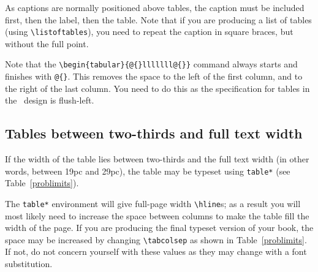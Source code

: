 As captions are normally positioned above tables, the caption must be included first, then the label, then the table. Note that if you are producing a list of tables (using \verb"\listoftables"), you need to repeat the caption in square braces, but without the full point.

Note that the \verb"\begin{tabular}{@{}lllllll@{}}" command always starts and finishes with \verb"@{}". This removes the space to the left of the first column, and to the right of the last column. You need to do this as the specification for tables in the \cambridge\ design is flush-left.

\subsection{Tables between two-thirds and full text width}
\label{overtwothirds}

If the width of the table lies between two-thirds and the full text width (in other words, between 19pc and 29pc), the table may be typeset using \verb"table*" (see Table~\ref{problimits}).

The \verb"table*" environment will give full-page width \verb"\hline"s; as a result you will most likely need to increase the space between columns to make the table fill the width of the page. If you are producing the final typeset version of your book, the space may be increased by changing \verb"\tabcolsep" as shown in Table~\ref{problimits}. If not, do not concern yourself with these values as they may change with a font substitution.

